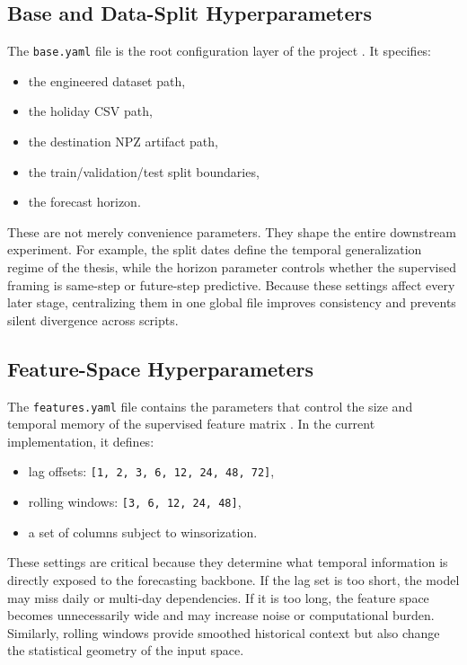 \subsection{Base and Data-Split Hyperparameters}

The \texttt{base.yaml} file is the root configuration layer of the project \cite{repo_thesis_grid_anomaly}. It specifies:
\begin{itemize}
	\item the engineered dataset path,
	\item the holiday CSV path,
	\item the destination NPZ artifact path,
	\item the train/validation/test split boundaries,
	\item the forecast horizon.
\end{itemize}
These are not merely convenience parameters. They shape the entire downstream experiment. For example, the split dates define the temporal generalization regime of the thesis, while the horizon parameter controls whether the supervised framing is same-step or future-step predictive. Because these settings affect every later stage, centralizing them in one global file improves consistency and prevents silent divergence across scripts.

\subsection{Feature-Space Hyperparameters}

The \texttt{features.yaml} file contains the parameters that control the size and temporal memory of the supervised feature matrix \cite{repo_thesis_grid_anomaly}. In the current implementation, it defines:
\begin{itemize}
	\item lag offsets: \texttt{[1, 2, 3, 6, 12, 24, 48, 72]},
	\item rolling windows: \texttt{[3, 6, 12, 24, 48]},
	\item a set of columns subject to winsorization.
\end{itemize}

These settings are critical because they determine what temporal information is directly exposed to the forecasting backbone. If the lag set is too short, the model may miss daily or multi-day dependencies. If it is too long, the feature space becomes unnecessarily wide and may increase noise or computational burden. Similarly, rolling windows provide smoothed historical context but also change the statistical geometry of the input space.

